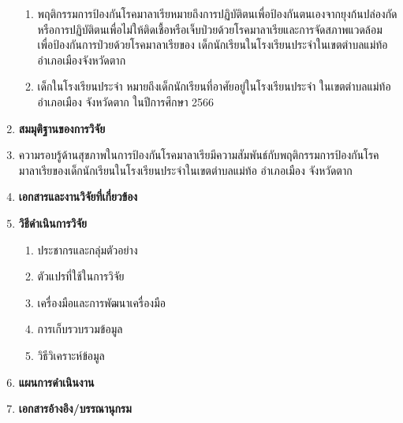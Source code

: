 \begin{titlepage}
\begin{enumerate}
\begin{enumerate}
            \item พฤติกรรมการป้องกันโรคมาลาเรียหมายถึงการปฏิบัติตนเพื่อป้องกันตนเองจากยุงก้นปล่องกัดหรือการปฏิบัติตนเพื่อไม่ให้ติดเชื้อหรือเจ็บป่วยด้วยโรคมาลาเรียและการจัดสภาพแวดล้อมเพื่อป้องกันการป่วยด้วยโรคมาลาเรียของ เด็กนักเรียนในโรงเรียนประจำในเขตตำบลแม่ท้ออำเภอเมืองจังหวัดตาก
            \item เด็กในโรงเรียนประจำ หมายถึงเด็กนักเรียนที่อาศัยอยู่ในโรงเรียนประจำ ในเขตตำบลแม่ท้ออำเภอเมือง จังหวัดตาก ในปีการศึกษา 2566
          \end{enumerate}

          \item\textbf{สมมุติฐานของการวิจัย}
    \item [] \quad ความรอบรู้ด้านสุขภาพในการป้องกันโรคมาลาเรียมีความสัมพันธ์กับพฤติกรรมการป้องกันโรคมาลาเรียของเด็กนักเรียนในโรงเรียนประจำในเขตตำบลแม่ท้อ อำเภอเมือง จังหวัดตาก


          \item\textbf{เอกสารและงานวิจัยที่เกี่ยวข้อง}

          \item\textbf{วิธีดำเนินการวิจัย}

          \begin{enumerate}

            \item ประชากรและกลุ่มตัวอย่าง

                  \lipsum[1-1]

            \item ตัวแปรที่ใช้ในการวิจัย

                  \lipsum[1-1]

            \item เครื่องมือและการพัฒนาเครื่องมือ

                  \lipsum[1-1]

            \item การเก็บรวบรวมข้อมูล

                  \lipsum[1-1]

            \item วิธีวิเคราะห์ข้อมูล

                  \lipsum[1-1]

          \end{enumerate}
          \item\textbf{แผนการดำเนินงาน}

          \lipsum[1-3]

          \item\textbf{เอกสารอ้างอิง/บรรณานุกรม}

          \lipsum[1-4]

  \end{enumerate}
\end{titlepage}